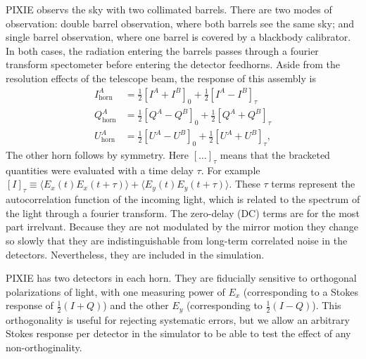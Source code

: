 \documentclass{article}
\begin{document}
PIXIE observs the sky with two collimated
barrels. There are two modes of observation: double barrel observation,
where both barrels see the same sky; and single barrel observation, where
one barrel is covered by a blackbody calibrator. In both cases, the
radiation entering the barrels passes through a fourier transform
spectometer before entering the detector feedhorns. Aside from the resolution
effects of the telescope beam, the response of this assembly is
\begin{align}
	I^A_\textrm{horn} &= \frac12 [I^A+I^B]_0 + \frac12[I^A-I^B]_\tau \\
	Q^A_\textrm{horn} &= \frac12 [Q^A-Q^B]_0 + \frac12[Q^A+Q^B]_\tau \\
	U^A_\textrm{horn} &= \frac12 [U^A-U^B]_0 + \frac12[U^A+U^B]_\tau,
\end{align}
The other horn follows by symmetry.
Here $[\ldots]_\tau$ means that
the bracketed quantities were evaluated with a time delay $\tau$. For
example $[I]_\tau \equiv \langle E_x(t)E_x(t+\tau)\rangle + \langle E_y(t)E_y(t+\tau)\rangle$.
These $\tau$ terms represent the autocorrelation function of the incoming
light, which is related to the spectrum of the light through a fourier transform.
The zero-delay (DC) terms are for the most part irrelvant. Because they are not
modulated by the mirror motion they change so slowly that they are indistinguishable
from long-term correlated noise in the detectors. Nevertheless, they are included
in the simulation.

PIXIE has two detectors in each horn. They are fiducially sensitive to orthogonal
polarizations of light, with one measuring power of $E_x$ (corresponding to a Stokes
response of $\frac12(I+Q)$) and the other $E_y$ (corresponding to $\frac12(I-Q)$).
This orthogonality is useful for rejecting systematic errors, but we allow an arbitrary
Stokes response per detector in the simulator to be able to test the effect of any
non-orthoginality.

%
\end{document}
